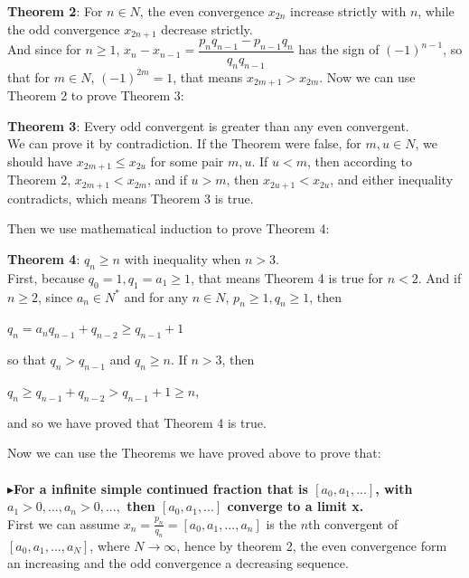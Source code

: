 \documentclass[12pt]{article}
\begin{document}
\par {\textbf{Theorem 2}}: For $n\in N$, the even convergence $x_{2n}$ increase strictly with $n$, while the odd convergence $x_{2n+1}$ decrease strictly.\\

And since for $n\geq 1$, $x_n-x_{n-1}=\dfrac{p_nq_{n-1}-p_{n-1}q_n}{q_nq_{n-1}}$ has the sign of $(-1)^{n-1}$, so that for $m\in N$, $(-1)^{2m}=1$, that means $x_{2m+1}>x_{2m}$.
Now we can use Theorem 2 to prove Theorem 3:\\

\par {\textbf{Theorem 3}}: Every odd convergent is greater than any even convergent.\\

We can prove it by contradiction. If the Theorem were false, for $m,u\in N$, we should have $x_{2m+1}\leq x_{2u}$ for some pair $m,u$. If $u<m$, then according to Theorem 2, $x_{2m+1}<x_{2m}$, and if $u>m$, then $x_{2u+1}<x_{2u}$, and either inequality contradicts, which means Theorem 3 is true.\\
\par Then we use mathematical induction to prove Theorem 4:\\

\par {\textbf{Theorem 4}}: $q_n\geq n$ with inequality when $n>3$.\\

First, because $q_0=1, q_1=a_1\geq 1$, that means Theorem 4 is true for $n<2$. And if $n\geq 2$, since $a_n\in N^*$ and for any $n\in N$, $p_n\geq1, q_n\geq1$, then

$q_n=a_nq_{n-1}+q_{n-2}\geq q_{n-1}+1$

so that $q_n>q_{n-1}$ and $q_n\geq n$. If $n>3$, then

$q_n\geq q_{n-1}+q_{n-2}>q_{n-1}+1\geq n$,

and so we have proved that Theorem 4 is true.\\
\par Now we can use the Theorems we have proved above to prove that:\\
\\
$\blacktriangleright${\textbf{For a infinite simple continued fraction that is $[a_0,a_1,...]$, with $a_1>0,...,a_n>0,...,$ then $[a_0,a_1,...]$ converge to a limit x.}}\\

First we can assume $x_n=\frac{p_n}{q_n}=[a_0,a_1,...,a_n]$ is the $n$th convergent of $[a_0,a_1,...,a_N]$, where $N\rightarrow \infty$, hence by theorem 2, the even convergence form an increasing and the odd convergence a decreasing sequence.
\end{document}
